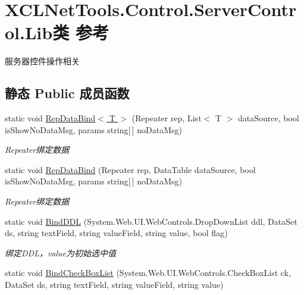 \hypertarget{class_x_c_l_net_tools_1_1_control_1_1_server_control_1_1_lib}{\section{X\-C\-L\-Net\-Tools.\-Control.\-Server\-Control.\-Lib类 参考}
\label{class_x_c_l_net_tools_1_1_control_1_1_server_control_1_1_lib}
}


服务器控件操作相关  


\subsection*{静态 Public 成员函数}
\begin{DoxyCompactItemize}
\item 
static void \hyperlink{class_x_c_l_net_tools_1_1_control_1_1_server_control_1_1_lib_a788673e8352bff030ce50d1b42cfd44f}{Rep\-Data\-Bind$<$ T $>$} (Repeater rep, List$<$ T $>$ data\-Source, bool is\-Show\-No\-Data\-Msg, params string\mbox{[}$\,$\mbox{]} no\-Data\-Msg)
\begin{DoxyCompactList}\small\item\em Repeater绑定数据 \end{DoxyCompactList}\item 
static void \hyperlink{class_x_c_l_net_tools_1_1_control_1_1_server_control_1_1_lib_ad2856902e5c392c722a55c82d9977586}{Rep\-Data\-Bind} (Repeater rep, Data\-Table data\-Source, bool is\-Show\-No\-Data\-Msg, params string\mbox{[}$\,$\mbox{]} no\-Data\-Msg)
\begin{DoxyCompactList}\small\item\em Repeater绑定数据 \end{DoxyCompactList}\item 
static void \hyperlink{class_x_c_l_net_tools_1_1_control_1_1_server_control_1_1_lib_a7d5141c14830a52c7d4edcab2d104452}{Bind\-D\-D\-L} (System.\-Web.\-U\-I.\-Web\-Controls.\-Drop\-Down\-List ddl, Data\-Set ds, string text\-Field, string value\-Field, string value, bool flag)
\begin{DoxyCompactList}\small\item\em 绑定\-D\-D\-L，value为初始选中值 \end{DoxyCompactList}\item 
static void \hyperlink{class_x_c_l_net_tools_1_1_control_1_1_server_control_1_1_lib_af2a5dcd9fa457696d15a072e4772b861}{Bind\-Check\-Box\-List} (System.\-Web.\-U\-I.\-Web\-Controls.\-Check\-Box\-List ck, Data\-Set ds, string text\-Field, string value\-Field, string value)

\end{DoxyCompactItemize}

